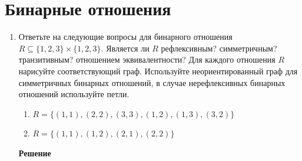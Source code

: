 \documentclass[12pt]{article}
\begin{document}
	\section{Бинарные отношения}
	\begin{enumerate}[label={\textbf{\arabic{section}.\arabic*}}]
		\item Ответьте на следующие вопросы для бинарного отношения $R\subseteq\{1, 2, 3\}\times\{1, 2, 3\}$. Является ли $R$ рефлексивным? симметричным? транзитивным? отношением эквивалентности? Для каждого отношения $R$ нарисуйте соответствующий граф. Используйте неориентированный граф для симметричных бинарных отношений, в случае нерефлексивных бинарных отношений используйте петли.
		\begin{enumerate}[label=\textbf{\alph*)}]
			\item $R = \{(1, 1),(2, 2),(3, 3),(1, 2),(1, 3),(3, 2)\}$
			\item $R = \{(1, 1),(1, 2),(2, 1),(2, 2)\}$
		\end{enumerate}
		
		\textbf{Решение}
		

\end{enumerate}
\end{document}
